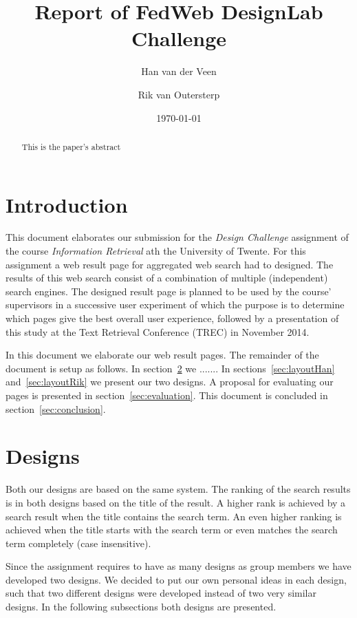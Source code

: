 \documentclass[12pt]{article}
\title{Report of FedWeb DesignLab Challenge}
\author{
        Han van der Veen \\
            \and
			Rik van Outersterp
}
\date{\today}
\begin{document}
\maketitle

\begin{abstract}
This is the paper's abstract
\end{abstract}

\section{Introduction}
This document elaborates our submission for the \textit{Design Challenge} assignment of the course \textit{Information Retrieval} ath the University of Twente. 
For this assignment a web result page for aggregated web search had to designed.
The results of this web search consist of a combination of multiple (independent) search engines.
The designed result page is planned to be used by the course' supervisors in a successive user experiment of which the purpose is to determine which pages give the best overall user experience, followed by a presentation of this study at the Text Retrieval Conference (TREC) in November 2014.

In this document we elaborate our web result pages.
The remainder of the document is setup as follows.
In section~\ref{sec:decisions} we .......
In sections~\ref{sec:layoutHan} and~\ref{sec:layoutRik} we present our two designs. 
A proposal for evaluating our pages is presented in section~\ref{sec:evaluation}.
This document is concluded in section~\ref{sec:conclusion}.

\section{Designs}
\label{sec:decisions}
Both our designs are based on the same system.
The ranking of the search results is in both designs based on the title of the result.
A higher rank is achieved by a search result when the title contains the search term.
An even higher ranking is achieved when the title starts with the search term or even matches the search term completely (case insensitive).

Since the assignment requires to have as many designs as group members we have developed two designs.
We decided to put our own personal ideas in each design, such that two different designs were developed instead of two very similar designs.
In the following subsections both designs are presented.
\end{document}
